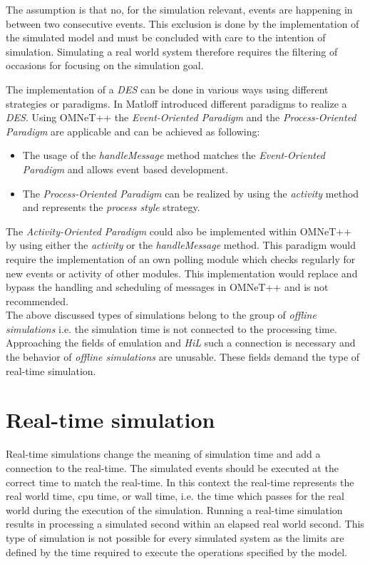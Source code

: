 The assumption is that no, for the simulation relevant, events are happening in between two consecutive events.
This exclusion is done by the implementation of the simulated model and must be concluded with care to the intention of simulation.
Simulating a real world system therefore requires the filtering of occasions for focusing on the simulation goal. \cite[section 4.1.1]{omnet_manual}

The implementation of a \emph{DES} can be done in various ways using different strategies or paradigms.
In \cite[chapter 2]{matloff_introduction_2008} Matloff introduced different paradigms to realize a \emph{DES}.
Using OMNeT++ the \emph{Event-Oriented Paradigm} and the \emph{Process-Oriented Paradigm} are applicable and can be achieved as following:

\begin{itemize}
    \item The usage of the \emph{handleMessage} method matches the \emph{Event-Oriented Paradigm} and allows event based development.
    \item The \emph{Process-Oriented Paradigm} can be realized by using the \emph{activity} method and represents the \emph{process style} strategy.
\end{itemize}

The \emph{Activity-Oriented Paradigm} could also be implemented within OMNeT++ by using either the \emph{activity} or the \emph{handleMessage} method.
This paradigm would require the implementation of an own polling module which checks regularly for new events or activity of other modules.
This implementation would replace and bypass the handling and scheduling of messages in OMNeT++ and is not recommended. \cite[chapter 2.1]{matloff_introduction_2008}
\\

The above discussed types of simulations belong to the group of \emph{offline simulations} i.e. the simulation time is not connected to the processing time.
Approaching the fields of emulation and \emph{HiL} such a connection is necessary and the behavior of \emph{offline simulations} are unusable.
These fields demand the type of real-time simulation.  \cite[section III.B]{belanger_what_2010}

\section{Real-time simulation}
\label{sec:simulation_real_time}
Real-time simulations change the meaning of simulation time and add a connection to the real-time.
The simulated events should be executed at the correct time to match the real-time.
In this context the real-time represents the real world time, cpu time, or wall time, i.e. the time which passes for the real world during the execution of the simulation.
Running a real-time simulation results in processing a simulated second within an elapsed real world second.
This type of simulation is not possible for every simulated system as the limits are defined by the time required to execute the operations specified by the model.

